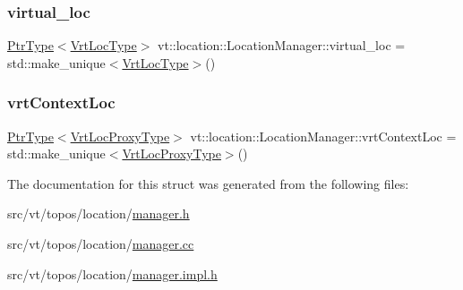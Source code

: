 \subsubsection{\texorpdfstring{virtual\+\_\+loc}{virtual\_loc}}
{\footnotesize\ttfamily \hyperlink{structvt_1_1location_1_1_location_manager_a32d8bca6ed6909a2190286408335d3b4}{Ptr\+Type}$<$\hyperlink{structvt_1_1location_1_1_location_manager_a06ec1698d93780afdf7873eeaa3a77b6}{Vrt\+Loc\+Type}$>$ vt\+::location\+::\+Location\+Manager\+::virtual\+\_\+loc = std\+::make\+\_\+unique$<$\hyperlink{structvt_1_1location_1_1_location_manager_a06ec1698d93780afdf7873eeaa3a77b6}{Vrt\+Loc\+Type}$>$()}

\mbox{\label{structvt_1_1location_1_1_location_manager_aec12685db3f4c7c9fec6348496689174}} 
\subsubsection{\texorpdfstring{vrt\+Context\+Loc}{vrtContextLoc}}
{\footnotesize\ttfamily \hyperlink{structvt_1_1location_1_1_location_manager_a32d8bca6ed6909a2190286408335d3b4}{Ptr\+Type}$<$\hyperlink{structvt_1_1location_1_1_location_manager_a3e410c85f5790a526a4eda22a9cc7881}{Vrt\+Loc\+Proxy\+Type}$>$ vt\+::location\+::\+Location\+Manager\+::vrt\+Context\+Loc = std\+::make\+\_\+unique$<$\hyperlink{structvt_1_1location_1_1_location_manager_a3e410c85f5790a526a4eda22a9cc7881}{Vrt\+Loc\+Proxy\+Type}$>$()}



The documentation for this struct was generated from the following files\+:\begin{DoxyCompactItemize}
\item 
src/vt/topos/location/\hyperlink{topos_2location_2manager_8h}{manager.\+h}\item 
src/vt/topos/location/\hyperlink{topos_2location_2manager_8cc}{manager.\+cc}\item 
src/vt/topos/location/\hyperlink{topos_2location_2manager_8impl_8h}{manager.\+impl.\+h}\end{DoxyCompactItemize}
